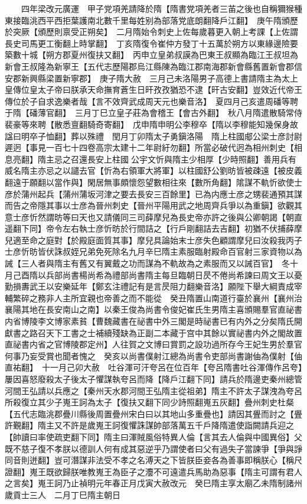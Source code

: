 　　四年梁改元廣運　甲子党項羌請降於隋【隋書党項羌者三苖之後也自稱獮猴種東接臨洮西平西拒葉護南北數千里每姓别為部落党底朗翻降戶江翻】　庚午隋頒歷於突厥【頒歷則禀受正朔矣】　二月隋始令刺史上佐每歲暮更入朝上考課【上佐謂長史司馬更工衡翻上時掌翻】　丁亥隋復令崔仲方發丁十五萬於朔方以東緣邊險要築數十城【朔方郡夏州復扶又翻】　丙申立皇弟叔謨為巴東王叔顯為臨江王叔坦為新會王叔隆為新寧王【五代志歷陽郡烏江縣陳為臨江郡南海郡新會縣舊置新會郡信安郡新興縣梁置新寧郡】　庚子隋大赦　三月己未洛陽男子高德上書請隋主為太上皇傳位皇太子帝曰朕承天命撫育蒼生日旰孜孜猶恐不逮【旰古安翻】豈效近代帝王傳位於子自求逸樂者哉【言不效齊武成周天元也樂音洛】　夏四月己亥遣周磻等聘于隋【磻薄官翻】　三月丁巳立皇子莊為會稽王【會古外翻】　秋八月隋遣散騎常侍裴豪等來聘【散悉亶翻騎奇寄翻】　戊申隋申明公李穆卒【隋以李穆能知幾保身故諡曰明卒子恤翻】葬以殊禮　閏月丁卯隋太子勇鎭洛陽　隋上柱國郕公梁士彦討尉遲迥【事見一百七十四卷高宗太建十二年尉紆勿翻】所當必破代迥為相州刺史【相息亮翻】隋主忌之召還長安上柱國公宇文忻與隋主少相厚【少時照翻】善用兵有威名隋主亦忌之以譴去官【忻為右領軍大將軍】以柱國舒公劉昉皆被疎遠【被皮義翻遠于願翻以當作與】閑居無事頗懷怨望數相往來【數所角翻】隂謀不軌忻欲使士彦於蒲州起兵【蒲州蒲坂河津之要去長安三百餘里】已為内應士彦之甥裴通預其謀而告之帝隱其事以士彦為晉州刺史【晉州平陽用武之地周齊兵爭以為重鎭】欲觀其意士彦忻然謂昉等曰天也又請儀同三司薛摩兒為長史帝亦許之後與公卿朝謁【朝直遥翻下同】帝令左右執士彦忻昉於行間詰之【行戶剛翻詰去吉翻】初猶不伏捕薛摩兒適至命之庭對【於殿庭面質其事】摩兒具論始末士彦失色顧謂摩兒曰汝殺我丙子士彦忻昉皆伏誅叔姪兄弟免死除名九月辛巳隋主素服臨射殿命百官射三家資物以為誡【三人者與隋主有舊又有翼戴之功而謀為不軌故為之素服而又以誡百官】　冬十月己酉隋以兵部尚書楊尚希為禮部尚書隋主每旦臨朝日昃不倦尚希諫曰周文王以憂勤損夀武王以安樂延年【鄭玄注禮記有是言昃阻力翻樂音洛】願陛下舉大綱責成宰輔繁碎之務非人主所宜親也帝善之而不能從　癸丑隋置山南道行臺於襄州【襄州治襄陽其地在長安南山之南】以秦王俊為尚書令俊妃崔氏生男隋主喜頒賜羣官直祕書内省博陵李文博家素貧【曹魏藏書在祕書中外三閣是時祕書已有内外之分矣隋氏開獻書之路召天下工書之士補續殘缺為正副二本藏于宫中其餘以實祕書内外之閣故置直祕書内省之官博陵郡定州】人往賀之文博曰賞罰之設功過所存今王妃生男於羣官何事乃妄受賞也聞者愧之　癸亥以尚書僕射江總為尚書令吏部尚書謝伷為僕射【伷直祐翻】　十一月己卯大赦　吐谷渾可汗夸呂在位百年【夸呂隋書吐谷渾傳作呂夸】屢因喜怒廢殺太子後太子懼謀執夸呂而降【降戶江翻下同】請兵於隋邊吏秦州總管河間王弘請以兵應之【秦州天水郡河間王弘隋主從祖弟】隋主不許太子謀洩為夸呂所殺復立其少子嵬王訶為太子【復扶又翻下同少詩照翻嵬五灰翻】疊州刺史杜粲【五代志臨洮郡疊川縣後周置疊州宋白曰以其地山多重疊也】請因其舋而討之【舋許覲翻】隋主又不許是歲嵬王訶復懼誅謀帥部落萬五千戶降隋遣使詣闕請兵迎之【帥讀曰率使疏吏翻下同】隋主曰渾賊風俗特異人倫【言其去人倫與中國異俗】父既不慈子復不孝朕以德訓人何有成其惡逆乎乃謂使者曰父有過失子當諫爭【爭與諍同音則迸翻】豈可潛謀非法受不孝之名溥天之下皆朕臣妾各為善事即稱朕心【稱尺證翻】嵬王既欲歸朕唯教嵬王為臣子之灋不可遠遣兵馬助為惡事【隋主可謂有君人之言矣】嵬王訶乃止禎明元年春正月戊寅大赦改元　癸巳隋主享太廟乙未隋制諸州歲貢士三人　二月丁巳隋主朝日

